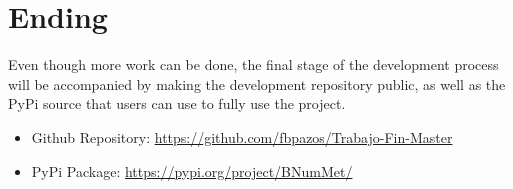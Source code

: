 \section{Ending}
Even though more work can be done, the final stage of the development process will be accompanied by making the development repository public, as well as the PyPi source that users can use to fully use the project. 
\begin{itemize}
    \item Github Repository: \href{https://github.com/fbpazos/Trabajo-Fin-Master}{https://github.com/fbpazos/Trabajo-Fin-Master}
    \item PyPi Package: \href{https://pypi.org/project/BNumMet/}{https://pypi.org/project/BNumMet/}
\end{itemize}
